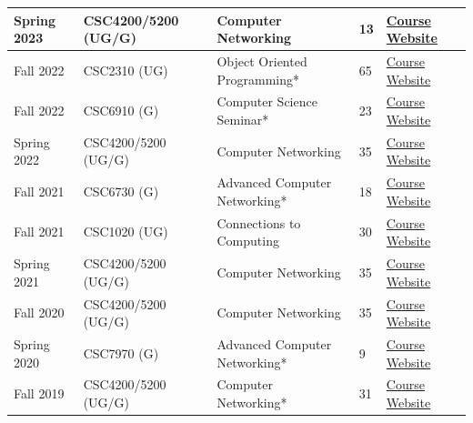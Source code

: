 \begin{longtable}{|p{1.4cm}|p{2.1cm}|p{5.5cm}|p{1.6cm}|p{1.5cm}|}
        Spring 2023 & CSC4200/5200 (UG/G)  & Computer Networking & 13 & \href{https://tntech-ngin.github.io/S23-CSC4200/}{Course Website} \\ \hline
        Fall 2022 & CSC2310 (UG) & Object Oriented Programming* & 65 & \href{https://catalog.tntech.edu/preview\_course\_nopop.php?catoid=23\&coid=73548}{Course Website} \\ \hline
        Fall 2022 & CSC6910 (G) & Computer Science Seminar* & 23 & \href{https://catalog.tntech.edu/preview_course_nopop.php?catoid=28&coid=86619}{Course Website} \\ \hline
        Spring 2022 & CSC4200/5200 (UG/G)  & Computer Networking & 35 & \href{https://tntech-ngin.github.io/S22-CSC4200/}{Course Website} \\ \hline
        Fall 2021 & CSC6730 (G) & Advanced Computer Networking* & 18 & \href{https://tntech-ngin.github.io/F21-CSC6730/}{Course Website} \\ \hline
        Fall 2021 & CSC1020 (UG) & Connections to Computing & 30 & \href{https://catalog.tntech.edu/preview_course_nopop.php?catoid=3&coid=9912}{Course Website} \\ \hline
        Spring 2021 & CSC4200/5200 (UG/G)  & Computer Networking & 35 & \href{https://tntech-ngin.github.io/csc4200/}{Course Website} \\ \hline
        Fall 2020 & CSC4200/5200 (UG/G)  & Computer Networking  & 35 & \href{https://tntech-ngin.github.io/csc4200/}{Course Website} \\ \hline
        Spring 2020 & CSC7970 (G) & Advanced Computer Networking* & 9 & \href{https://tntech-ngin.github.io/csc7970/}{Course Website} \\ \hline
        Fall 2019 & CSC4200/5200 (UG/G)  & Computer Networking*  & 31 & \href{https://tntech-ngin.github.io/csc4200/}{Course Website} \\ \hline
\end{longtable}





